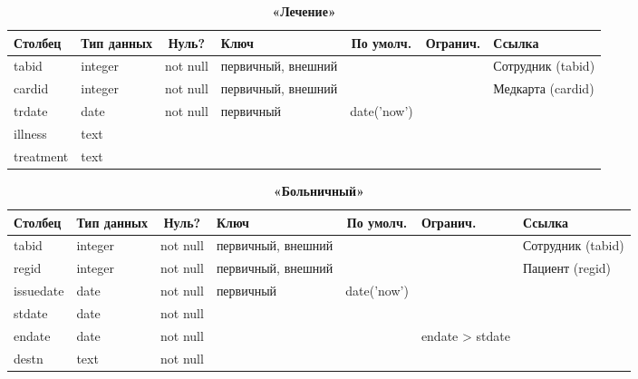 \documentclass[14pt,a4paper,russian]{extreport}
\begin{document}
\begin{table}[h]
    \caption{ } 
    \begin{subtable}[t]{\textwidth}
        \caption{\textbf{«Лечение»}}
    \begin{tabularx}{\textwidth}{| X | X | c | X | c | c | X |}
        \hline
        \textbf{Столбец} & \textbf{Тип данных} & \textbf{Нуль?} & \textbf{Ключ} & \textbf{По
        умолч.} & \textbf{Огранич.} & \textbf{Ссылка} \\ \hline
        tabid & integer & not null & первичный, внешний & & & Сотрудник (tabid) \\ \hline
        cardid & integer & not null & первичный, внешний & & & Медкарта (cardid) \\ \hline
        trdate & date & not null & первичный & date('now') & & \\ \hline 
        illness & text & & & & & \\ \hline
        treatment & text & & & & & \\ \hline
    \end{tabularx}
    \end{subtable}
    \label{table:treat}
\end{table}

\cleardoublepage
\begin{table}[t!]
    \caption{ } 
    \begin{subtable}[t]{\textwidth}
        \caption{\textbf{«Больничный»}}
    \begin{tabularx}{\textwidth}{| X | X | c | X | c | X | X |}
        \hline
        \textbf{Столбец} & \textbf{Тип данных} & \textbf{Нуль?} & \textbf{Ключ} & \textbf{По
        умолч.} & \textbf{Огранич.} & \textbf{Ссылка} \\ \hline
            tabid & integer & not null & первичный, внешний & & & Сотрудник (tabid) \\ \hline

            regid & integer & not null & первичный, внешний & & & Пациент (regid)\\ \hline
            issuedate & date & not null & первичный & date('now') & & \\ \hline
        stdate & date & not null & & & & \\ \hline
        endate & date & not null & & & endate > stdate & \\ \hline
        destn & text & not null & & & & \\ \hline
    \end{tabularx}
    \end{subtable}
    \label{table:sickleave}
\end{table}
\end{document}
